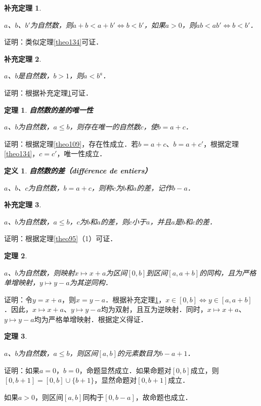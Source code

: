 \documentclass[12pt, a4paper, oneside]{book}
\newtheorem{theo}{定理}
\newtheorem{cor}{补充定理}
\newtheorem{de}{定义}
\begin{document}
			\begin{cor}\label{cor310}
				\hfill\par
				$a$、$b$、$b'$为自然数，则$a+b<a+b'\Leftrightarrow b<b'$，如果$a>0$，则$ab<ab'\Leftrightarrow b<b'$．
			\end{cor}
			证明：类似定理\ref{theo134}可证．
			
			\begin{cor}\label{cor311}
				\hfill\par
				$a$、$b$是自然数，$b>1$，则$a<b^a$．
			\end{cor}
			证明：根据补充定理\ref{cor310}可证．
			
			\begin{theo}\label{theo135}
				\textbf{自然数的差的唯一性}
				\par
				$a$、$b$为自然数，$a\leq b$，则存在唯一的自然数$c$，使$b=a+c$．
			\end{theo}
			证明：根据定理\ref{theo109}，存在性成立．若$b=a+c$、$b=a+c'$，根据定理\ref{theo134}，$c=c'$，唯一性成立．
			
			\begin{de}
				\textbf{自然数的差（différence de entiers）}
				\par
				$a$、$b$、$c$为自然数，$b=a+c$，则称$c$为$b$和$a$的差，记作$b-a$．
			\end{de}
			
			\begin{cor}\label{cor312}
				\hfill\par
				$a$、$b$为自然数，$a\leq b$，$c$为$b$和$a$的差，则$c$小于$a$，并且$a$是$b$和$c$的差．
			\end{cor}
			证明：根据定理\ref{theo95}（1）可证．
			
			\begin{theo}\label{theo136}
				\hfill\par
				$a$、$b$为自然数，则映射$x\mapsto x+a$为区间$[0, b]$到区间$[a, a+b]$的同构，且为严格单增映射，$y\mapsto y-a$为其逆同构．
			\end{theo}
			证明：令$y=x+a$，则$x=y-a$．根据补充定理\ref{cor310}，$x\in [0, b]\Leftrightarrow y\in [a, a+b]$．因此，$x\mapsto x+a$、$y\mapsto y-a$均为双射，且互为逆映射．同时，$x\mapsto x+a$、$y\mapsto y-a$均为严格单增映射．根据定义得证．
			
			\begin{theo}\label{theo137}
				\hfill\par
				$a$、$b$为自然数，$a\leq b$，则区间$[a, b]$的元素数目为$b-a+1$．
			\end{theo}
			证明：如果$a=0$，$b=0$，命题显然成立．如果命题对$[0, b]$成立，则$[0, b+1]=[0, b]\cup\{b+1\}$，显然命题对$[0, b+1]$成立．
			\par
			如果$a>0$，则区间$[a, b]$同构于$[0, b-a]$，故命题也成立．
			
\end{document}

